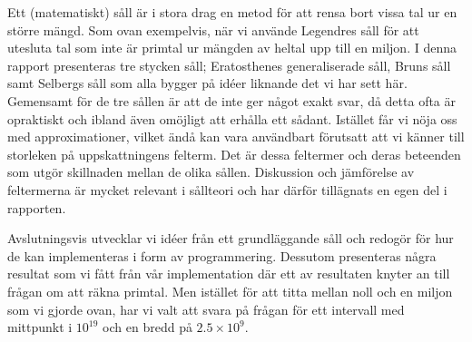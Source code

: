 Ett (matematiskt) såll är i stora drag en metod för att rensa bort vissa tal ur en större mängd.
Som ovan exempelvis, när vi använde Legendres såll för att utesluta tal som inte är primtal ur mängden av heltal upp till en miljon.
I denna rapport presenteras tre stycken såll;
Eratosthenes generaliserade såll, Bruns såll samt Selbergs såll som alla bygger på idéer liknande det vi har sett här.
Gemensamt för de tre sållen är att de inte ger något exakt svar, då detta ofta är opraktiskt och ibland även omöjligt att erhålla ett sådant.
Istället får vi nöja oss med approximationer, vilket ändå kan vara användbart förutsatt att vi känner till storleken på uppskattningens felterm.
Det är dessa feltermer och deras beteenden som utgör skillnaden mellan de olika sållen.
Diskussion och jämförelse av feltermerna är mycket relevant i sållteori och har därför tillägnats en egen del i rapporten.


Avslutningsvis utvecklar vi idéer från ett grundläggande såll och redogör för hur de kan implementeras i form av programmering.
Dessutom presenteras några resultat som vi fått från vår implementation där ett av resultaten knyter an till frågan om att räkna primtal.
Men istället för att titta mellan noll och en miljon som vi gjorde ovan, har vi valt att svara på frågan för ett intervall med mittpunkt i $10^{19}$ och en bredd på $2.5\times10^9$.













